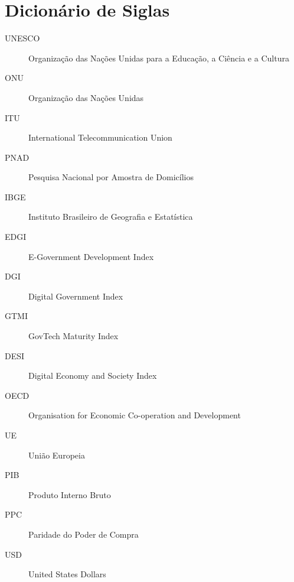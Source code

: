 \section*{Dicionário de Siglas}

\begin{description}
    \item[UNESCO] Organização das Nações Unidas para a Educação, a Ciência e a Cultura
    \item[ONU] Organização das Nações Unidas
    \item[ITU] International Telecommunication Union
    \item[PNAD] Pesquisa Nacional por Amostra de Domicílios
    \item[IBGE] Instituto Brasileiro de Geografia e Estatística
    \item[EDGI] E-Government Development Index
    \item[DGI] Digital Government Index  
    \item[GTMI] GovTech Maturity Index
    \item[DESI] Digital Economy and Society Index 
    \item[OECD] Organisation for Economic Co-operation and Development
    \item[UE] União Europeia 
    \item[PIB] Produto Interno Bruto 
    \item[PPC] Paridade do Poder de Compra 
    \item[USD] United States Dollars
\end{description}